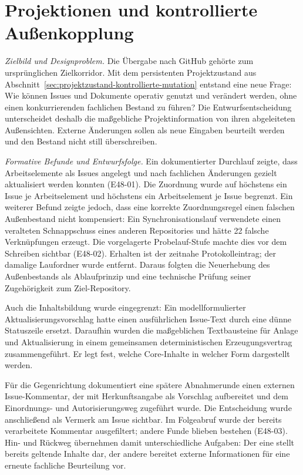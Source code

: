 \section{Projektionen und kontrollierte Außenkopplung}
\label{sec:projektionen-aussenkopplung}

\emph{Zielbild und Designproblem.} Die Übergabe nach GitHub gehörte
zum ursprünglichen Zielkorridor. Mit dem persistenten Projektzustand
aus Abschnitt~\ref{sec:projektzustand-kontrollierte-mutation} entstand
eine neue Frage: Wie können Issues und Dokumente operativ genutzt
und verändert werden, ohne einen konkurrierenden fachlichen Bestand
zu führen? Die Entwurfsentscheidung unterscheidet deshalb die
maßgebliche Projektinformation von ihren abgeleiteten Außensichten.
Externe Änderungen sollen als neue Eingaben beurteilt werden und
den Bestand nicht still überschreiben.

\emph{Formative Befunde und Entwurfsfolge.} Ein dokumentierter
Durchlauf zeigte, dass Arbeitselemente als Issues angelegt und nach
fachlichen Änderungen gezielt aktualisiert werden konnten (E48-01).
Die Zuordnung wurde auf höchstens ein Issue je Arbeitselement und
höchstens ein Arbeitselement je Issue begrenzt. Ein weiterer Befund
zeigte jedoch, dass eine korrekte Zuordnungsregel einen falschen
Außenbestand nicht kompensiert: Ein Synchronisationslauf verwendete
einen veralteten Schnappschuss eines anderen Repositories und hätte
22 falsche Verknüpfungen erzeugt. Die vorgelagerte Probelauf-Stufe
machte dies vor dem Schreiben sichtbar (E48-02). Erhalten ist der
zeitnahe Protokolleintrag; der damalige Laufordner wurde entfernt.
Daraus folgten die Neuerhebung des Außenbestands als Ablaufprinzip
und eine technische Prüfung seiner Zugehörigkeit zum Ziel-Repository.

Auch die Inhaltsbildung wurde eingegrenzt: Ein modellformulierter
Aktualisierungsvorschlag hatte einen ausführlichen Issue-Text durch
eine dünne Statuszeile ersetzt. Daraufhin wurden die maßgeblichen
Textbausteine für Anlage und Aktualisierung in einem gemeinsamen
deterministischen Erzeugungsvertrag zusammengeführt. Er legt fest,
welche Core-Inhalte in welcher Form dargestellt werden.

Für die Gegenrichtung dokumentiert eine spätere Abnahmerunde einen
externen Issue-Kommentar, der mit Herkunftsangabe als Vorschlag
aufbereitet und dem Einordnungs- und Autorisierungsweg zugeführt
wurde. Die Entscheidung wurde anschließend als Vermerk am Issue
sichtbar. Im Folgeabruf wurde der bereits verarbeitete Kommentar
ausgefiltert; andere Funde blieben bestehen (E48-03). Hin- und Rückweg übernehmen damit unterschiedliche
Aufgaben: Der eine stellt bereits geltende Inhalte dar, der andere
bereitet externe Informationen für eine erneute fachliche Beurteilung
vor.

